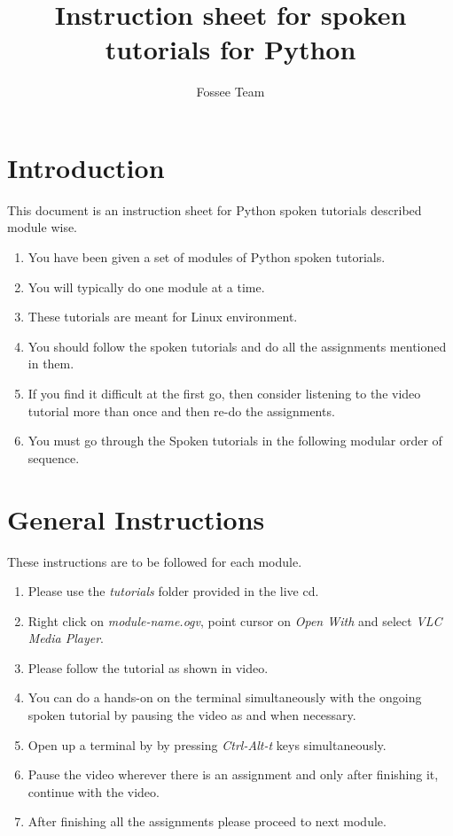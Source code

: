 \documentclass[11pt,twocolumn]{article}
\begin{document}
\title{Instruction sheet for spoken tutorials for Python}
\author{Fossee Team}
\maketitle
\section*{Introduction }
{This document is an instruction sheet for Python spoken tutorials described module wise.}
\setlength{\columnsep}{15pt }
\begin{enumerate}
  \item You have been given a set of modules of Python spoken tutorials.
  \item You will typically do one module at a time.
  \item These tutorials are meant for Linux environment.
  \item You should follow the spoken tutorials and do all the assignments mentioned in them.
   \item If you find it difficult at the first go, then consider listening to the video tutorial more than once and then re-do the assignments.
   \item You must go through the Spoken tutorials in the following modular order of sequence. 
  

\end{enumerate}

\section*{General Instructions}
{These instructions are to be followed for each module.}
\setlength{\columnsep}{15pt }
\begin{enumerate}
	  
	
	\item Please use the \emph{tutorials} folder provided in the live cd.
     \item Right click on \emph{module-name.ogv}, point cursor on \emph{Open With} and select \emph{VLC Media Player}.
  \item Please follow the tutorial as shown in video.
  \item You can do a hands-on on the terminal simultaneously with the ongoing spoken tutorial by pausing the video as and when necessary.
  \item Open up a terminal by by pressing \emph{Ctrl-Alt-t} keys simultaneously.
  \item Pause the video wherever there is an assignment and only after finishing it, continue with the video.
  \item After finishing all the assignments please proceed to next module. 

\end{enumerate}
\end{document}
